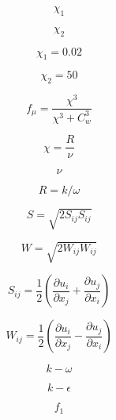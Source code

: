 \begin{equation}
\chi_1
\end{equation}

\begin{equation}
\chi_2
\end{equation}

\begin{equation}
\chi_1 = 0.02
\end{equation}

\begin{equation}
\chi_2 = 50
\end{equation}

\begin{equation}
f_{\mu}=\frac{\chi^3}{\chi^3+C^3_w}
\end{equation}

\begin{equation}
\chi=\frac{R}{\nu}
\end{equation}

\begin{equation}
\nu
\end{equation}

\begin{equation}
R = k/\omega
\end{equation}

\begin{equation}
S=\sqrt{2S_{ij}S_{ij}}
\end{equation}

\begin{equation}
W=\sqrt{2W_{ij}W_{ij}}
\end{equation}

\begin{equation}
S_{ij}=\frac 12\left(\frac{\partial u_i}{\partial x_j}+\frac{\partial u_j}{\partial x_i}\right)
\end{equation}

\begin{equation}
W_{ij}=\frac 12\left(\frac{\partial u_i}{\partial x_j}-\frac{\partial u_j}{\partial x_i}\right)
\end{equation}

\begin{equation}
k-\omega
\end{equation}

\begin{equation}
k-\epsilon
\end{equation}

\begin{equation}
f_1
\end{equation}

